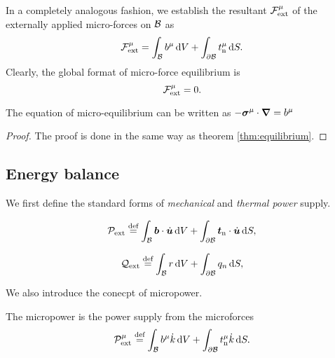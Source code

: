 In a completely analogous fashion, we establish the
resultant ${\mathcal F}_{\mathrm{ext}}^{\mathrm{\mu}}$ of the externally applied micro-forces on $\mathcal{B}$ as
\begin{equation}
  {\mathcal F}_{\mathrm{ext}}^{\mathrm{\mu}} = \int_{\mathcal{B}} b^{\mathrm{\mu}} \mathop{}\!\mathrm{d} V + \int_{\partial \mathcal{B}}  t_{\mathrm{n}}^{\mathrm{\mu}} \mathop{}\!\mathrm{d} S.
    \label{eq:vol_I_ch02_eq4a}
\end{equation}
Clearly, the global format of micro-force equilibrium is
\begin{equation}
 {\mathcal F}_{\mathrm{ext}}^{\mathrm{\mu}} = 0.
    \label{eq:vol_I_ch02_eq4b}
\end{equation}

\begin{theorem} \label{thm:micro_equilibrium}
The equation of micro-equilibrium can be written as
   $- \bm{\sigma}^{\mathrm{\mu}} \cdot {\bm\nabla} = b^{\mathrm{\mu}}$
\end{theorem}
\begin{proof}
The proof is done in the same way as theorem \ref{thm:equilibrium}.
\end{proof}



\subsection{Energy balance}
We first define the standard forms of {\em mechanical} and {\em thermal power} supply.
\begin{definition}
\begin{equation}
  {\mathcal P}_{\mathrm{ext}} \stackrel{\text{def}}{=}
  \int_{\mathcal{B}} {\bm b} \cdot \dot{\bm {u}} \mathop{}\!\mathrm{d} V +
  \int_{\partial \mathcal{B}} \bm{t}_{\mathrm{n}} \cdot \dot{\bm {u}} \mathop{}\!\mathrm{d} S,
  \label{eq:vol_I_ch02_eq16}
\end{equation}
\end{definition}

\begin{definition}
\begin{equation}
  {\mathcal Q}_{\mathrm{ext}} \stackrel{\text{def}}{=}
  \int_{\mathcal{B}} r \mathop{}\!\mathrm{d} V + \int_{\partial \mathcal{B}} q_n \mathop{}\!\mathrm{d} S,
\label{eq:vol_I_ch02_eq17}
\end{equation}
\end{definition}
We also introduce the conecpt of micropower.
\begin{definition}[Micropower]
The micropower is the power supply from the microforces
\begin{equation}
  {\mathcal P}_{\mathrm{ext}}^{\mathrm{\mu}} \stackrel{\text{def}}{=}
  \int_{\mathcal{B}}  b^{\mathrm{\mu}} \dot{k}  \mathop{}\!\mathrm{d} V +
  \int_{\partial \mathcal{B}}  t_{\mathrm{n}}^{\mathrm{\mu}} \dot{k}  \mathop{}\!\mathrm{d} S.
\label{eq:vol_I_ch02_eq16a}
\end{equation}
\end{definition}




